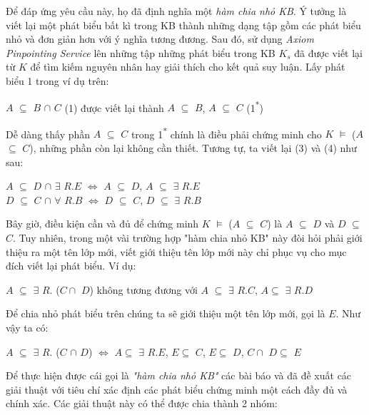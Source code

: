 \hspace*{0.05\textwidth} Để đáp ứng yêu cầu này, họ đã định nghĩa một \textit{hàm chia nhỏ KB}. Ý tưởng là viết lại một phát biểu bất kì trong KB thành những dạng tập gồm các phát biểu nhỏ và đơn giản hơn với ý nghĩa  tương đương. Sau đó, sử dụng \textit{Axiom Pinpointing Service} lên những tập những phát biểu trong KB $K_{s}$ đã được viết lại từ $K$ để tìm kiếm nguyên nhân hay giải thích cho kết quả suy luận. Lấy phát biểu 1 trong ví dụ trên:
\begin{center}
	$A$ $\subseteq$ $B$ $\cap$ $C$ (1) được viết lại thành $A$ $\subseteq$ $B$, $A$ $\subseteq$ $C$ (1\textsuperscript{*})
\end{center}
Dễ dàng thấy phần $A$ $\subseteq$ $C$ trong 1\textsuperscript{*} chính là điều phải chứng minh cho $K$ $\models$ ($A$ $\subseteq$ $C$), những phần còn lại không cần thiết. Tương tự, ta viết lại (3) và (4) như sau:
\begin{center}
	$A$ $\subseteq$ $D$ $\cap$ $\exists$ $R.E$  $\Leftrightarrow$ $A$ $\subseteq$ $D$, $A$ $\subseteq$ $\exists$ $R.E$
	\\
	$D$ $\subseteq$ $C$ $\cap$ $\forall$ $R.B$ $\Leftrightarrow$ $D$ $\subseteq$ $C$, $D$ $\subseteq$ $\exists$ $R.B$
\end{center}
Bây giờ, điều kiện cần và đủ để chứng minh $K$ $\models$ ($A$ $\subseteq$ $C$) là $A$ $\subseteq$ $D$ và $D$ $\subseteq$ $C$. Tuy nhiên, trong một vài trường hợp "hàm chia nhỏ KB" này đòi hỏi phải giới thiệu ra một tên lớp mới, viết giới thiệu tên lớp mới này chỉ phục vụ cho mục đích viết lại phát biểu. Ví dụ:	
\begin{center}
	$A$ $\subseteq$ $\exists$ $R.$ ($C\cap$ $D$) không tương đương với $A$ $\subseteq$ $\exists$ $R.C$, $A\subseteq$ $\exists$ $R.D$
\end{center}
Để chia nhỏ phát biểu trên chúng ta sẽ giới thiệu một tên lớp mới, gọi là $E$.	Như vậy ta có:
\begin{center}
	$A$ $\subseteq$ $\exists$ $R.$ ($C$ $\cap$ $D$) $\Leftrightarrow$ $A\subseteq$ $\exists$ $R.E$, $E\subseteq$ $C$, $E\subseteq$ $D$, $C\cap$ $D\subseteq$ $E$
\end{center}
Để thực hiện được cái gọi là \textit{"hàm chia nhỏ KB"} các bài báo \cite{repair} và \cite{axiomPinpoint} đã đề xuất các giải thuật với tiêu chí xác định các phát biểu chứng minh một cách đầy đủ và chính xác. Các giải thuật này có thể được chia thành 2 nhóm:
